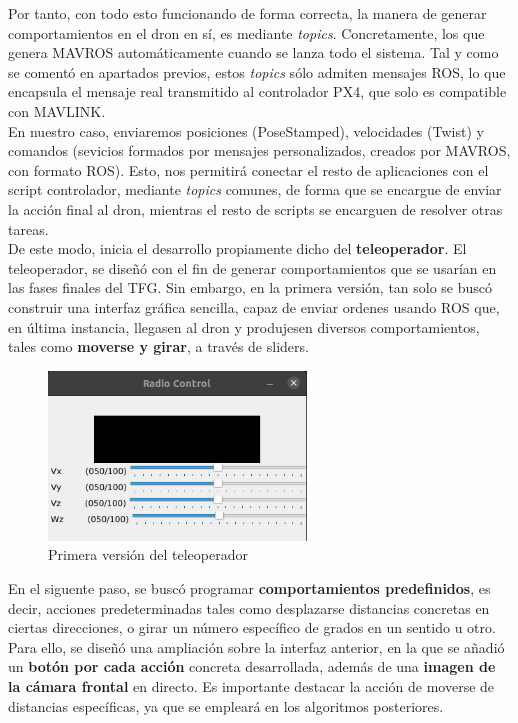 Por tanto, con todo esto funcionando de forma correcta, la manera de generar comportamientos en el dron en sí, es mediante \emph{topics}. Concretamente, los que genera MAVROS automáticamente cuando se lanza todo el sistema. Tal y como se comentó en apartados previos, estos \emph{topics} sólo admiten mensajes \ac{ROS}, lo que encapsula el mensaje real transmitido al controlador PX4, que solo es compatible con MAVLINK.\\

En nuestro caso, enviaremos posiciones (PoseStamped), velocidades (Twist) y comandos (sevicios formados por mensajes personalizados, creados por MAVROS, con formato \ac{ROS}). Esto, nos permitirá conectar el resto de aplicaciones con el script controlador, mediante \emph{topics} comunes, de forma que se encargue de enviar la acción final al dron, mientras el resto de scripts se encarguen de resolver otras tareas.\\

De este modo, inicia el desarrollo propiamente dicho del \textbf{teleoperador}. El teleoperador, se diseñó con el fin de generar comportamientos que se usarían en las fases finales del \ac{TFG}. Sin embargo, en la primera versión, tan solo se buscó construir una interfaz gráfica sencilla, capaz de enviar ordenes usando \ac{ROS} que, en última instancia, llegasen al dron y produjesen diversos comportamientos, tales como \textbf{moverse y girar}, a través de sliders.\\

\begin{figure} [H]
	\begin{center}
	\includegraphics[height=4.5cm]{imagenes/cap4/2_axes_rc.png}
	\end{center}
	\caption[Primera versión del teleoperador]{Primera versión del teleoperador}
	\label{fig:teleoperador_v1}
\end{figure}

En el siguente paso, se buscó programar \textbf{comportamientos predefinidos}, es decir, acciones predeterminadas tales como desplazarse distancias concretas en ciertas direcciones, o girar un número específico de grados en un sentido u otro. Para ello, se diseñó una ampliación sobre la interfaz anterior, en la que se añadió un \textbf{botón por cada acción} concreta desarrollada, además de una \textbf{imagen de la cámara frontal} en directo. Es importante destacar la acción de moverse de distancias específicas, ya que se empleará en los algoritmos posteriores.\\

